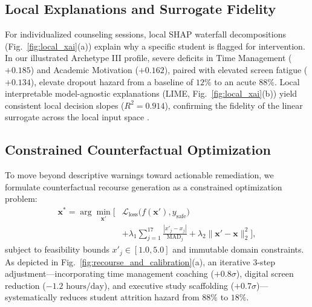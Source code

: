 \documentclass[twocolumn,10pt,a4paper]{article}
\begin{document}
\subsection{Local Explanations and Surrogate Fidelity}
For individualized counseling sessions, local SHAP waterfall decompositions (Fig.~\ref{fig:local_xai}(a)) explain why a specific student is flagged for intervention. In our illustrated Archetype III profile, severe deficits in Time Management ($+0.185$) and Academic Motivation ($+0.162$), paired with elevated screen fatigue ($+0.134$), elevate dropout hazard from a baseline of $12\%$ to an acute $88\%$. Local interpretable model-agnostic explanations (LIME, Fig.~\ref{fig:local_xai}(b)) yield consistent local decision slopes ($R^2 = 0.914$), confirming the fidelity of the linear surrogate across the local input space \cite{ribeiro2016why, morris2024evaluating}.

\subsection{Constrained Counterfactual Optimization}
To move beyond descriptive warnings toward actionable remediation, we formulate counterfactual recourse generation as a constrained optimization problem:
\begin{equation}
\begin{aligned}
    \mathbf{x}^* = \arg\min_{\mathbf{x}'} \Big[ &\mathcal{L}_{\text{loss}}\big(f(\mathbf{x}'), y_{\text{safe}}\big) \\
    &+ \lambda_1 \sum_{j=1}^{17} \frac{|x'_j - x_j|}{\text{MAD}_j} + \lambda_2 \|\mathbf{x}' - \mathbf{x}\|_2^2 \Big],
\end{aligned}
\end{equation}
subject to feasibility bounds $x'_j \in [1.0, 5.0]$ and immutable domain constraints. As depicted in Fig.~\ref{fig:recourse_and_calibration}(a), an iterative 3-step adjustment—incorporating time management coaching ($+0.8\sigma$), digital screen reduction ($-1.2\text{ hours/day}$), and executive study scaffolding ($+0.7\sigma$)—systematically reduces student attrition hazard from $88\%$ to $18\%$.
\end{document}
